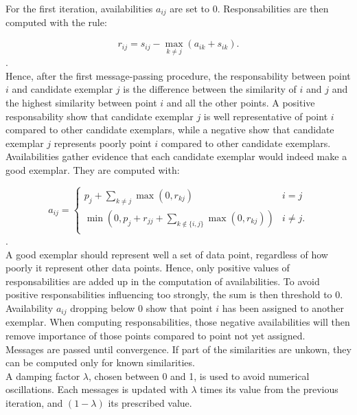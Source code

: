 \documentclass{ipol}
\begin{document}
For the first iteration, availabilities $a_{ij}$ are set to 0.
Responsabilities are then computed with the rule:

\begin{equation*}
r_{ij} = s_{ij} - \max_{k \neq j} (a_{ik} + s_{ik}).
\end{equation*}.
\\

Hence, after the first message-passing procedure, the responsability between
point $i$ and candidate exemplar $j$ is the difference between the similarity
of $i$ and $j$ and the highest similarity between point $i$ and all the other
points. A positive responsability show that candidate exemplar $j$ is well
representative of point $i$ compared to other candidate exemplars, while a
negative show that candidate exemplar $j$ represents poorly point $i$ compared
to other candidate exemplars. \\


Availabilities gather evidence that each candidate exemplar would indeed make
a good exemplar. They are computed with:

\begin{equation*}
a_{ij} = \begin{cases}
	    p_j + \sum_{k \neq j} \max(0, r_{kj}) &  i = j \\
	    \min (0, p_j + r_{jj} + \sum_{k \notin \{i, j\} } \max (0, r_{kj}))
	    & i \neq j.\\
	 \end{cases}
\end{equation*}. \\

A good exemplar should represent well a set of data point, regardless of how
poorly it represent other data points. Hence, only positive values of
responsabilities are added up in the computation of availabilities. To avoid
positive responsabilities influencing too strongly, the sum is then threshold
to 0. Availability $a_{ij}$ dropping below 0 show that point $i$ has been
assigned to another exemplar. When computing responsabilities, those negative
availabilities will then remove importance of those points compared to point
not yet assigned. \\

Messages are passed until convergence. If part of the similarities are unkown,
they can be computed only for known similarities. \\

A damping factor $\lambda$, chosen between 0 and 1, is used to avoid numerical
oscillations. Each messages is updated with $\lambda$ times its value from the
previous iteration, and $(1 - \lambda)$ its prescribed value. \\
\end{document}

